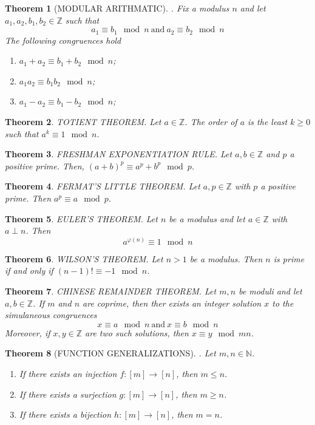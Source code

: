 \documentclass[12pt]{article}
\newtheorem{theorem}{Theorem}
\newcommand{\Z}{\mathbb{Z}}
\newcommand{\N}{\mathbb{N}}
\begin{document}
\begin{theorem}
[MODULAR ARITHMATIC]. Fix a modulus $n$ and let $a_1, a_2, b_1, b_2 \in \Z$ such that 
$$a_1 \equiv b_1 \mod{n}\ \text{and}\ a_2 \equiv b_2 \mod{n}$$
The following congruences hold
\begin{enumerate}
    \item $a_1 + a_2 \equiv b_1 + b_2 \mod{n}$;
    \item $a_1a_2 \equiv b_1b_2 \mod{n}$;
    \item $a_1 - a_2 \equiv b_1 - b_2 \mod{n}$;
\end{enumerate}
\end{theorem}


\begin{theorem}
TOTIENT THEOREM. Let $a \in \Z$. The order of $a$ is the least $k \geq 0$ such that $a^k \equiv 1 \mod{n}$. 
\end{theorem}


\begin{theorem}
FRESHMAN EXPONENTIATION RULE. Let $a, b \in \Z$ and $p $ a positive prime. Then, $(a+b)^p \equiv a^p + b^p \mod{p}$. 
\end{theorem}


\begin{theorem}
FERMAT'S LITTLE THEOREM. Let $a, p \in \Z$ with $p$ a positive prime. Then $a^p \equiv a \mod{p}$. 
\end{theorem}


\begin{theorem}
EULER'S THEOREM. Let $n$ be a modulus and let $a \in \Z$ with $a \perp n$. Then
$$a^{\varphi(n)} \equiv 1 \mod{n}$$
\end{theorem}


\begin{theorem}
WILSON'S THEOREM. Let $n > 1$ be a modulus. Then $n$ is prime if and only if $(n-1)! \equiv -1 \mod{n}$.
\end{theorem}


\begin{theorem}
CHINESE REMAINDER THEOREM. Let $m, n$ be moduli and let $a, b \in \Z$. If $m$ and $n$ are coprime, then ther exists an integer solution $x$ to the simulaneous congruences 
$$x \equiv a \mod{n}\ \text{and}\ x \equiv b \mod{n}$$
Moreover, if $x, y \in \Z$ are two such solutions, then $x \equiv y \mod{mn}$. 
\end{theorem}


\begin{theorem}
[FUNCTION GENERALIZATIONS]. Let $m, n \in \N$. 
\begin{enumerate}
    \item If there exists an injection $f:[m] \to [n]$, then $m \leq n$. 
    \item If there exists a surjection $g:[m] \to [n]$, then $m \geq n$.
    \item If there exists a bijection $h:[m] \to [n]$, then $m = n$.
\end{enumerate}
\end{theorem}
\end{document}
